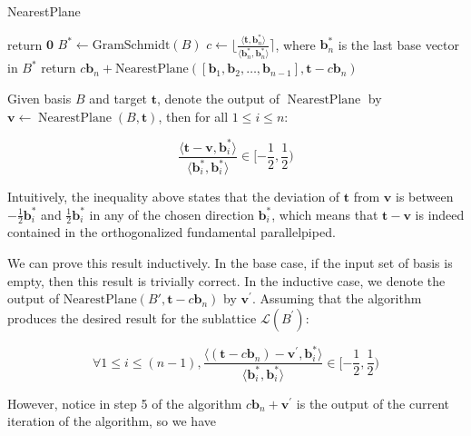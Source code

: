 \begin{algorithm}
\caption{NearestPlane}
\begin{algorithmic}[1]
        \State return $\mathbf{0}$
    \EndIf 
    \State $B^\ast \leftarrow \text{GramSchmidt}(B)$
    \State $c \leftarrow \lfloor \frac{\langle\mathbf{t}, \mathbf{b}_n^\ast\rangle}{\langle\mathbf{b}_n^\ast, \mathbf{b}_n^\ast\rangle} \rceil$, where $\mathbf{b}_n^\ast$ is the last base vector in $B^\ast$
    \State return $c\mathbf{b}_n + \text{NearestPlane}([\mathbf{b}_1, \mathbf{b}_2, \ldots, \mathbf{b}_{n-1}], \mathbf{t} - c\mathbf{b}_n)$
\end{algorithmic}
\end{algorithm}


\begin{theorem}
    Given basis $B$ and target $\mathbf{t}$, denote the output of $\operatorname{NearestPlane}$ by $\mathbf{v} \leftarrow \operatorname{NearestPlane}(B, \mathbf{t})$, then for all $1 \leq i \leq n$:

    $$
    \frac{
        \langle
            \mathbf{t} - \mathbf{v}, \mathbf{b}_i^\ast
        \rangle
    }{
        \langle
            \mathbf{b}_i^\ast, \mathbf{b}_i^\ast
        \rangle
    } 
    \in [-\frac{1}{2}, \frac{1}{2})
        $$
    \end{theorem}

Intuitively, the inequality above states that the deviation of $\mathbf{t}$ from $\mathbf{v}$ is between $-\frac{1}{2}\mathbf{b}_i^\ast$ and $\frac{1}{2}\mathbf{b}_i^\ast$ in any of the chosen direction $\mathbf{b}_i^\ast$, which means that $\mathbf{t} - \mathbf{v}$ is indeed contained in the orthogonalized fundamental parallelpiped.

We can prove this result inductively. In the base case, if the input set of basis is empty, then this result is trivially correct. In the inductive case, we denote the output of $\text{NearestPlane}(B', \mathbf{t} - c\mathbf{b}_n)$ by $\mathbf{v}^\prime$. Assuming that the algorithm produces the desired result for the sublattice $\mathcal{L}(B^\prime)$:

$$
\forall 1 \leq i \leq (n-1), 
\frac{
    \langle
        (\mathbf{t} - c\mathbf{b}_n) - \mathbf{v}^\prime, 
        \mathbf{b}_i^\ast
    \rangle
}{
    \langle
        \mathbf{b}_i^\ast, \mathbf{b}_i^\ast
    \rangle
} \in [-\frac{1}{2}, \frac{1}{2})
$$

However, notice in step 5 of the algorithm $c\mathbf{b}_n + \mathbf{v}^\prime$ is the output of the current iteration of the algorithm, so we have

